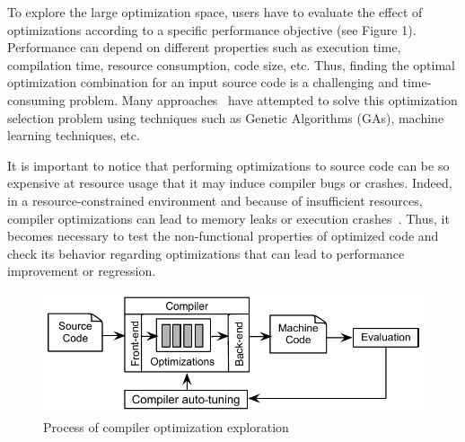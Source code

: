 To explore the large optimization space, users have to evaluate the effect of optimizations according to a specific performance objective (see Figure 1). Performance can depend on different properties such as execution time, compilation time, resource consumption, code size, etc.
Thus, finding the optimal optimization combination for an input source code is a challenging and time-consuming problem. 
Many approaches~\cite{hoste2008cole,martins2014exploration} have attempted to solve this optimization selection problem using techniques such as Genetic Algorithms (GAs), machine learning techniques, etc.

It is important to notice that performing optimizations to source code can be so expensive at resource usage that it may induce compiler bugs or crashes. 
Indeed, in a resource-constrained environment and because of insufficient resources, compiler optimizations can lead to memory leaks or execution crashes~\cite{yang2011finding}. 
Thus, it becomes necessary to test the non-functional properties of optimized code and check its behavior regarding optimizations that can lead to performance improvement or regression.


\begin{figure}[h]
	\centering
	\includegraphics[width=0.9\linewidth]{chapitre3/fig/autotuning.pdf}
	\caption{Process of compiler optimization exploration}
	
\end{figure}


